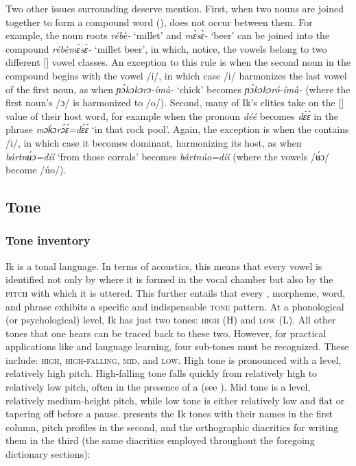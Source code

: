 Two other issues surrounding  deserve mention. First, when two nouns are joined together to form a compound word (),  does not occur between them. For example, the noun roots \textit{rébè-} ‘millet’ and \textit{m\`{ɛ}s\`{ɛ}-} ‘beer’ can be joined into the compound \textit{rébèm\`{ɛ}s\`{ɛ}-} ‘millet beer’, in which, notice, the vowels belong to two different [] vowel classes. An exception to this rule is when the second noun in the compound begins with the vowel /i/, in which case /i/ harmonizes the last vowel of the first noun, as when \textit{ɲ\'{ɔ}kɔkɔrɔ-ímà-} ‘chick’ becomes \textit{ɲ\'{ɔ}kɔkɔró-ímà-} (where the first noun’s /ɔ/ is harmonized to /o/). Second, many of Ik’s clitics take on the [] value of their host word, for example when the  pronoun \textit{déé} becomes \textit{d\'{ɛ}\'{ɛ}} in the phrase \textit{mɔƙɔr\'{ɔ}\'{ɛ}=d\'{ɛ}\'{ɛ}} ‘in that rock pool’. Again, the exception is when the  contains /i/, in which case it becomes dominant, harmonizing its host, as when \textit{bár{\Í}t{\Í}n\'{ʉ}ɔ=díí} ‘from those corrals’ becomes \textit{bár{\Í}t{\Í}núo=díí} (where the vowels /\'{ʉ}ɔ/ become /úo/).
 
\subsection{Tone}\label{sec:2.6}
\subsubsection{Tone inventory}\label{sec:2.6.1}

Ik is a tonal language. In terms of acoustics, this means that every vowel is identified not only by where it is formed in the vocal chamber but also by the \textsc{pitch} with which it is uttered. This further entails that every , morpheme, word, and phrase exhibits a specific and indispensable \textsc{tone} pattern. At a phonological (or psychological) level, Ik has just two tones: \textsc{high} (H) and \textsc{low (L)}. All other tones that one hears can be traced back to these two. However, for practical applications like  and language learning, four sub-tones must be recognized. These include: \textsc{high}, \textsc{high-falling}, \textsc{mid}, and \textsc{low}. High tone is pronounced with a level, relatively high pitch. High-falling tone falls quickly from relatively high to relatively low pitch, often in the presence of a  (see ). Mid tone is a level, relatively medium-height pitch, while low tone is either relatively low and flat or tapering off before a pause.  presents the Ik tones with their names in the first column, pitch profiles in the second, and the orthographic diacritics for writing them in the third (the same diacritics employed throughout the foregoing dictionary sections):


